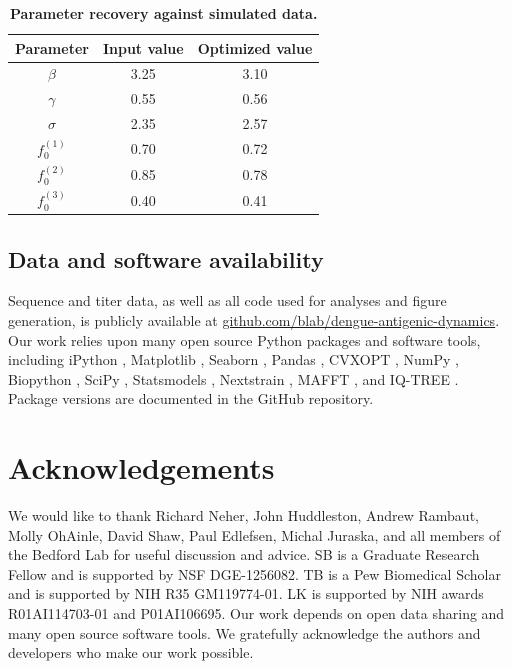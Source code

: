 \documentclass[11pt,oneside,letterpaper]{article}
\begin{document}
\begin{table}[ht!]
  \centering
  \caption{
    \textbf{Parameter recovery against simulated data.}
  }
  \label{simulation_parameters}
  \begin{tabular}{c c c}
    \hline
    Parameter     & Input value & Optimized value \\
    \hline
    $\beta$       & 3.25        & 3.10 \\
    $\gamma$      & 0.55        & 0.56 \\
    $\sigma$      & 2.35        & 2.57 \\
    $f_{0}^{(1)}$ & 0.70        & 0.72 \\
    $f_{0}^{(2)}$ & 0.85        & 0.78 \\
    $f_{0}^{(3)}$ & 0.40        & 0.41 \\
    \hline
  \end{tabular}
\end{table}


\subsection*{Data and software availability}
Sequence and titer data, as well as all code used for analyses and figure generation, is publicly available at \href{https://github.com/blab/dengue-antigenic-dynamics}{github.com/blab/dengue-antigenic-dynamics}.
Our work relies upon many open source Python packages and software tools, including iPython \citep{perez2007ipython}, Matplotlib \citep{Hunter2007computing}, Seaborn \citep{waskomseaborn}, Pandas \citep{mckinney2010data}, CVXOPT \citep{andersen2013cvxopt}, NumPy \citep{van2011numpy,gao2012implementing}, Biopython \citep{cock2009biopython}, SciPy \citep{jones2001scipy}, Statsmodels \citep{seabold2010statsmodels}, Nextstrain \citep{hadfield2018nextstrain}, MAFFT \citep{katoh2013mafft}, and IQ-TREE \citep{nguyen2014iq}.
Package versions are documented in the GitHub repository.

\section*{Acknowledgements}
We would like to thank Richard Neher, John Huddleston, Andrew Rambaut, Molly OhAinle, David Shaw, Paul Edlefsen, Michal Juraska, and all members of the Bedford Lab for useful discussion and advice.
SB is a Graduate Research Fellow and is supported by NSF DGE-1256082.
TB is a Pew Biomedical Scholar and is supported by NIH R35 GM119774-01.
LK is supported by NIH awards R01AI114703-01 and P01AI106695.
Our work depends on open data sharing and many open source software tools.
We gratefully acknowledge the authors and developers who make our work possible.
\end{document}
